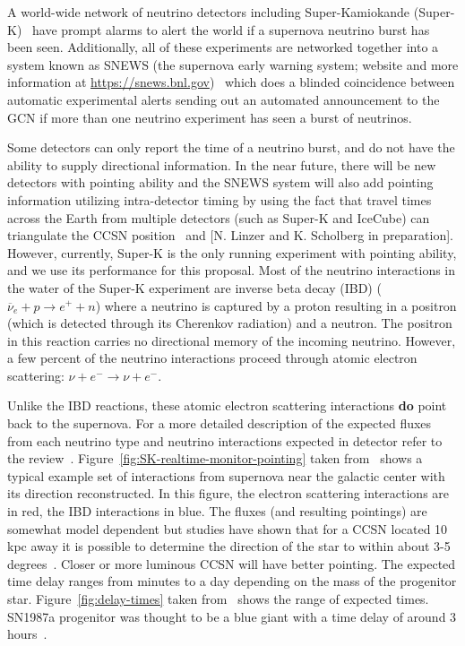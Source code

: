 \documentclass[11pt, letterpaper]{article}
\newcommand{\superk}  {Super\nobreakdash-K\xspace}
\begin{document}
A world-wide network of neutrino detectors including Super-Kamiokande
(\superk)~\cite{2003NIMPA.501..418F} have prompt alarms to alert the
world if a supernova neutrino burst has been seen.  Additionally, all
of these experiments are networked together into a system known as
SNEWS (the supernova early warning system; website and more
information at \url{https://snews.bnl.gov})~\cite{2004NJPh....6..114A}
which does a blinded coincidence between automatic experimental alerts
sending out an automated announcement to the GCN if more than one
neutrino experiment has seen a burst of neutrinos.

Some detectors can only report the time of a neutrino burst, and do
not have the ability to supply directional information.  In the near
future, there will be new detectors with pointing ability and the
SNEWS system will also add pointing information utilizing
intra-detector timing by using the fact that travel times across the
Earth from multiple detectors (such as \superk and IceCube) can
triangulate the CCSN position~\cite{2018JCAP...04..025B} and [N. Linzer
and K. Scholberg in preparation].  However, currently,
\superk is the only running experiment with pointing ability, and we
use its performance for this proposal. Most of the neutrino
interactions in the water of the \superk experiment are inverse beta
decay (IBD) ($ \overline{\nu}_{e}+ p \rightarrow e^{+} + n $) where a
neutrino is captured by a proton resulting in a positron (which is
detected through its Cherenkov radiation) and a neutron.  The positron
in this reaction carries no directional memory of the incoming
neutrino. However, a few percent of the neutrino interactions proceed
through atomic electron scattering:
$\nu + e^{-} \rightarrow \nu + e^{-} .$

Unlike the IBD reactions, these atomic electron scattering
interactions {\bf do} point back to the supernova.  For a more
detailed description of the expected fluxes from each neutrino type
and neutrino interactions expected in detector refer to the
review~\cite{2012ARNPS..62...81S}.
Figure~\ref{fig:SK-realtime-monitor-pointing} taken
from~\cite{2016APh....81...39A} shows a typical example set of
interactions from supernova near the galactic center with its
direction reconstructed.  In this figure, the electron scattering
interactions are in red, the IBD interactions in blue.  The fluxes
(and resulting pointings) are somewhat model dependent but studies
have shown that for a CCSN located 10 kpc away it is possible to
determine the direction of the star to within about 3-5
degrees~\cite{2016APh....81...39A}.  Closer or more luminous CCSN will
have better pointing.  The expected time delay ranges from minutes to
a day depending on the mass of the progenitor
star. Figure~\ref{fig:delay-times} taken
from~\cite{2013ApJ...778...81K} shows the range of expected times.
SN1987a progenitor was thought to be a blue giant with a time delay of
around 3 hours~\cite{ISAWTHISSOMWHERE}.
\end{document}
